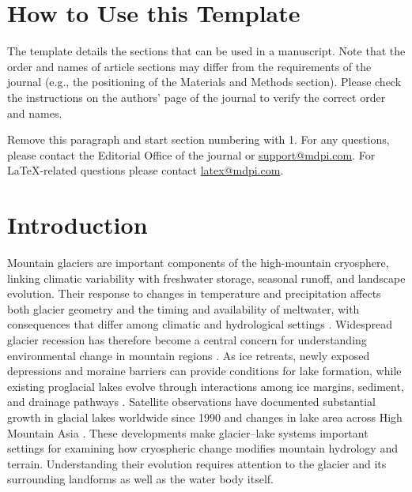 \documentclass[geosciences,article,submit,moreauthors]{Definitions/mdpi}
\begin{document}
\setcounter{section}{-1} %
\section{How to Use this Template}

The template details the sections that can be used in a manuscript. Note that the order and names of article sections may differ from the requirements of the journal (e.g., the positioning of the Materials and Methods section). Please check the instructions on the authors' page of the journal to verify the correct order and names. 

Remove this paragraph and start section numbering with 1. For any questions, please contact the Editorial Office of the journal or \href{mailto:support@mdpi.com}{support@mdpi.com}. For LaTeX-related questions please contact \href{mailto:latex@mdpi.com}{latex@mdpi.com}.%


\section{Introduction}

Mountain glaciers are important components of the high-mountain cryosphere, linking climatic variability with freshwater storage, seasonal runoff, and landscape evolution. Their response to changes in temperature and precipitation affects both glacier geometry and the timing and availability of meltwater, with consequences that differ among climatic and hydrological settings \citep{Oerlemans2001,Kaser2010}. Widespread glacier recession has therefore become a central concern for understanding environmental change in mountain regions \citep{barry2006,Bolch2012}. As ice retreats, newly exposed depressions and moraine barriers can provide conditions for lake formation, while existing proglacial lakes evolve through interactions among ice margins, sediment, and drainage pathways \citep{Carrivick2013}. Satellite observations have documented substantial growth in glacial lakes worldwide since 1990 and changes in lake area across High Mountain Asia \citep{shugar2020,Zhang2022}. These developments make glacier--lake systems important settings for examining how cryospheric change modifies mountain hydrology and terrain. Understanding their evolution requires attention to the glacier and its surrounding landforms as well as the water body itself.
\end{document}

